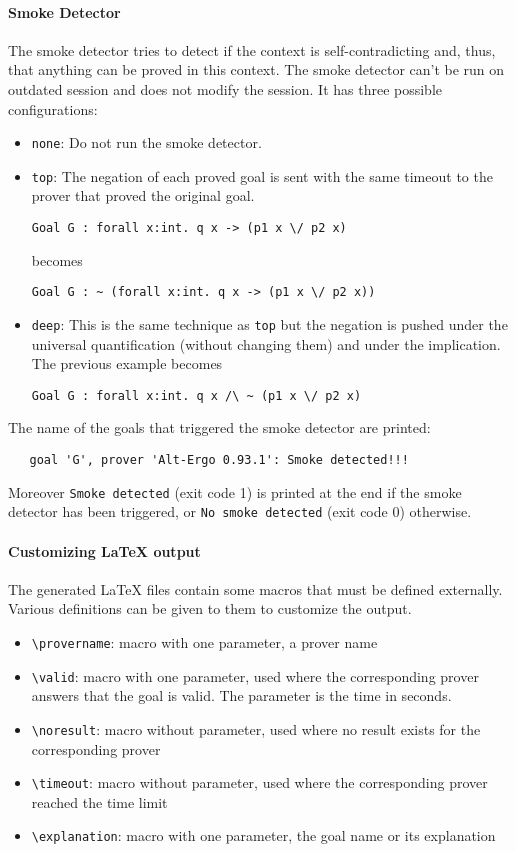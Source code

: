 \paragraph{Smoke Detector}
The smoke detector tries to detect if the context is self-contradicting
 and, thus, that anything can be proved in this context. The smoke
 detector can't be run on outdated session and does not modify the session.
 It has three possible configurations:
 \begin{itemize}
\item \texttt{none}: Do not run the smoke detector.
\item \texttt{top}: The negation of each proved goal is sent with the
same timeout to the prover that proved the original goal.
\begin{verbatim}
Goal G : forall x:int. q x -> (p1 x \/ p2 x)
\end{verbatim}
becomes
\begin{verbatim}
Goal G : ~ (forall x:int. q x -> (p1 x \/ p2 x))
\end{verbatim}
\item \texttt{deep}: This is the same technique as \texttt{top} but the
   negation is pushed under the universal quantification (without
   changing them) and under the implication. The previous example becomes
\begin{verbatim}
Goal G : forall x:int. q x /\ ~ (p1 x \/ p2 x)
\end{verbatim}
 \end{itemize}

\noindent
The name of the goals that triggered the smoke detector are printed:
\begin{verbatim}
   goal 'G', prover 'Alt-Ergo 0.93.1': Smoke detected!!!
\end{verbatim}
Moreover \texttt{Smoke detected} (exit code 1) is printed at the end if the smoke
detector has been triggered, or \texttt{No smoke detected} (exit code 0)
otherwise.


\paragraph{Customizing LaTeX output}

The generated LaTeX files contain some macros that must be defined
externally.  Various definitions can be given to them to customize the
output. 
\begin{itemize}
\item \verb|\provername|: macro with one parameter, a prover name
\item \verb|\valid|: macro with one parameter, used where the corresponding prover answers that the goal is valid. The parameter is the time in seconds.
\item \verb|\noresult|: macro without parameter, used where no result
  exists for the corresponding prover
\item \verb|\timeout|: macro without parameter, used where the corresponding prover reached the time limit
\item \verb|\explanation|: macro with one parameter, the goal name or its explanation
\end{itemize}

